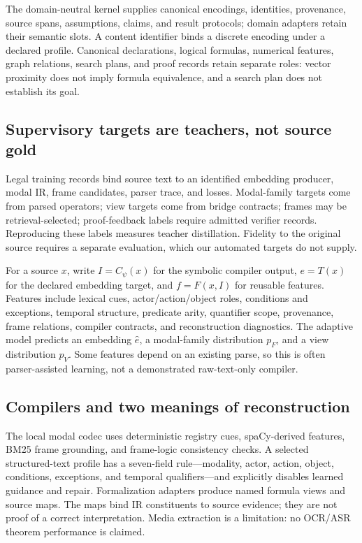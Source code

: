 \documentclass{article}
\begin{document}
The domain-neutral kernel supplies canonical encodings, identities, provenance, source spans, assumptions, claims, and result protocols; domain adapters retain their semantic slots. A content identifier binds a discrete encoding under a declared profile. Canonical declarations, logical formulas, numerical features, graph relations, search plans, and proof records retain separate roles: vector proximity does not imply formula equivalence, and a search plan does not establish its goal.

\subsection{Supervisory targets are teachers, not source gold}
Legal training records bind source text to an identified embedding producer, modal IR, frame candidates, parser trace, and losses. Modal-family targets come from parsed operators; view targets come from bridge contracts; frames may be retrieval-selected; proof-feedback labels require admitted verifier records. Reproducing these labels measures teacher distillation. Fidelity to the original source requires a separate evaluation, which our automated targets do not supply.

For a source $x$, write $I=C_\psi(x)$ for the symbolic compiler output, $e=T(x)$ for the declared embedding target, and $f=F(x,I)$ for reusable features. Features include lexical cues, actor/action/object roles, conditions and exceptions, temporal structure, predicate arity, quantifier scope, provenance, frame relations, compiler contracts, and reconstruction diagnostics. The adaptive model predicts an embedding $\hat e$, a modal-family distribution $p_F$, and a view distribution $p_V$. Some features depend on an existing parse, so this is often parser-assisted learning, not a demonstrated raw-text-only compiler.

\subsection{Compilers and two meanings of reconstruction}
The local modal codec uses deterministic registry cues, spaCy-derived features, BM25 frame grounding, and frame-logic consistency checks. A selected structured-text profile has a seven-field rule---modality, actor, action, object, conditions, exceptions, and temporal qualifiers---and explicitly disables learned guidance and repair. Formalization adapters produce named formula views and source maps. The maps bind IR constituents to source evidence; they are not proof of a correct interpretation. Media extraction is a limitation: no OCR/ASR theorem performance is claimed.
\end{document}
